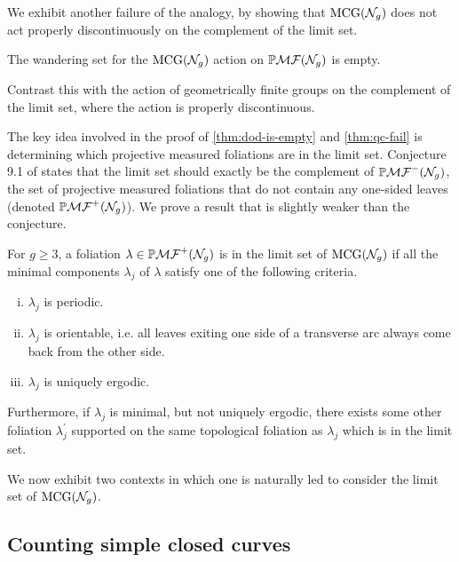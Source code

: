 \documentclass[12pt, reqno]{amsart}
\begin{document}
We exhibit another failure of the analogy, by showing that $\mathrm{MCG}(\mathcal{N}_g)$ does not act properly discontinuously on the complement of the limit set.
\begingroup
\def\thetheorem{\ref{thm:dod-is-empty}}
\begin{theorem}
  The wandering set for the $\mathrm{MCG}(\mathcal{N}_g)$ action on $\mathbb{P}\mathcal{MF}(\mathcal{N}_g)$ is empty.
\end{theorem}
\addtocounter{theorem}{-1}
\endgroup
Contrast this with the action of geometrically finite groups on the complement of the limit set, where the action is properly discontinuous.

The key idea involved in the proof of \autoref{thm:dod-is-empty} and \autoref{thm:qc-fail} is determining which projective measured foliations are in the limit set.
Conjecture 9.1 of \cite{gendulphe_whats_2017} states that the limit set should exactly be the complement of $\mathbb{P}\mathcal{MF}^-(\mathcal{N}_g)$, the set of projective measured foliations that do not contain any one-sided leaves (denoted $\mathbb{P}\mathcal{MF}^+(\mathcal{N}_g)$).
We prove a result that is slightly weaker than the conjecture.
\begingroup
\def\thetheorem{\ref{thm:rational-approximation}}
\begin{theorem}
  For $g \geq 3$, a foliation $\lambda \in \mathbb{P}\mathcal{MF}^+(\mathcal{N}_g)$ is in the limit set of $\mathrm{MCG}(\mathcal{N}_g)$ if all the minimal components $\lambda_j$ of $\lambda$ satisfy one of the following criteria.
  \begin{enumerate}[(i)]
  \item $\lambda_j$ is periodic.
  \item $\lambda_j$ is orientable, i.e. all leaves exiting one side of a transverse arc always come back from the other side.
  \item $\lambda_j$ is uniquely ergodic.
  \end{enumerate}
  Furthermore, if $\lambda_j$ is minimal, but not uniquely ergodic, there exists some other foliation $\lambda_j^{\prime}$ supported on the same topological foliation as $\lambda_j$ which is in the limit set.
\end{theorem}
\addtocounter{theorem}{-1}
\endgroup

We now exhibit two contexts in which one is naturally led to consider the limit set of $\mathrm{MCG}(\mathcal{N}_g)$.

\subsection*{Counting simple closed curves}
\end{document}

